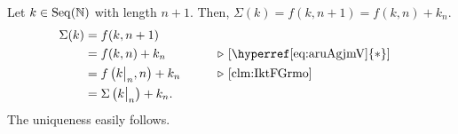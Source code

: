 \documentclass[../introduction_to_set_theory.tex]{subfiles}
\begin{document}
{    Let \(k \in \Seq(\NN)\) with length \(n + 1\).
    Then, \(\Sigma(k) = f(k, n+1) = f(k, n) + k_n\).
    \begin{alignat*}{2}
        \Sigma(k) &= f(k, n+1) \\
                  &= f(k, n) + k_n &\qquad& \comment*{[\hyperref[eq:aruAgjmV]{\(\ast\)}]}\\
                  &= f\left(\restr{k}{n}, n\right) + k_n && \comment*{\Cref{clm:IktFGrmo}} \\
                  &= \Sigma \left(\restr{k}{n}\right) + k_n.
    \end{alignat*}
    The uniqueness easily follows.
}


%     


\end{document}
